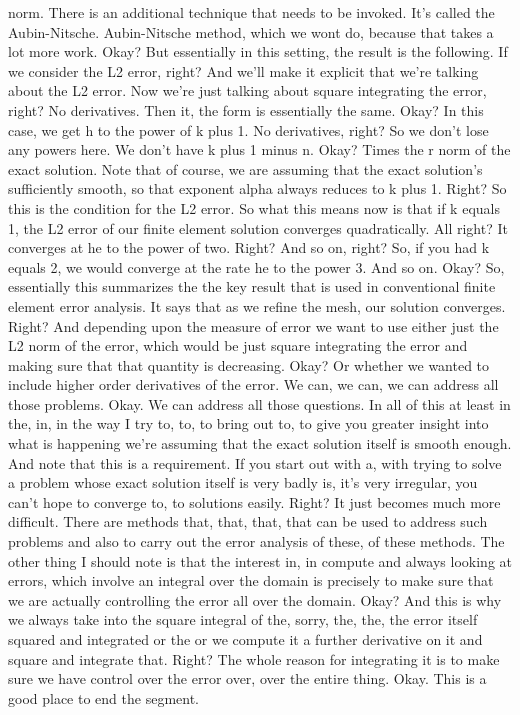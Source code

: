 \documentclass[10pt]{article}
\begin{document}
{norm. There is an additional technique that needs to be invoked. It's called the Aubin-Nitsche. Aubin-Nitsche method, which we wont do, because that takes a lot more work. Okay? But essentially in this setting, the result is the following. If we consider the L2 error, right? And we'll make it explicit that we're talking about the L2 error. Now we're just talking about square integrating the error, right? No derivatives. Then it, the form is essentially the same. Okay? In this case, we get h to the power of k plus 1. No derivatives, right? So we don't lose any powers here. We don't have k plus 1 minus n. Okay? Times the r norm of the exact solution. Note that of course, we are assuming that the exact solution's sufficiently smooth, so that exponent alpha always reduces to k plus 1. Right? So this is the condition for the L2 error. So what this means now is that if k equals 1, the L2 error of our finite element solution converges quadratically. All right? It converges at he to the power of two. Right? And so on, right? So, if you had k equals 2, we would converge at the rate he to the power 3. And so on. Okay? So, essentially this summarizes the the key result that is used in conventional finite element error analysis. It says that as we refine the mesh, our solution converges. Right? And depending upon the measure of error we want to use either just the L2 norm of the error, which would be just square integrating the error and making sure that that quantity is decreasing. Okay? Or whether we wanted to include higher order derivatives of the error. We can, we can, we can address all those problems. Okay. We can address all those questions. In all of this at least in the, in, in the way I try to, to, to bring out to, to give you greater insight into what is happening we're assuming that the exact solution itself is smooth enough. And note that this is a requirement. If you start out with a, with trying to solve a problem whose exact solution itself is very badly is, it's very irregular, you can't hope to converge to, to solutions easily. Right? It just becomes much more difficult. There are methods that, that, that, that can be used to address such problems and also to carry out the error analysis of these, of these methods. The other thing I should note is that the interest in, in compute and always looking at errors, which involve an integral over the domain is precisely to make sure that we are actually controlling the error all over the domain. Okay? And this is why we always take into the square integral of the, sorry, the, the, the error itself squared and integrated or the or we compute it a further derivative on it and square and integrate that. Right? The whole reason for integrating it is to make sure we have control over the error over, over the entire thing. Okay. This is a good place to end the segment.

}
\end{document}
